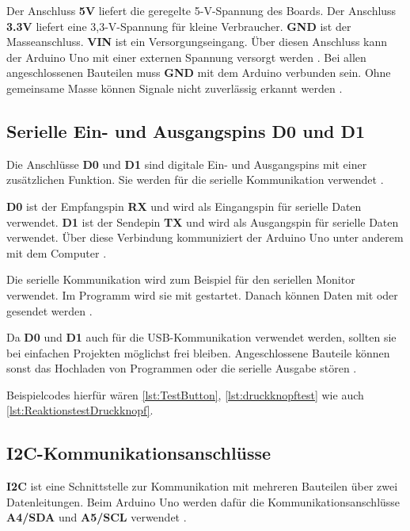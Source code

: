 Der Anschluss \textbf{5V} liefert die geregelte 5-V-Spannung des Boards. Der Anschluss \textbf{3.3V} liefert eine 3,3-V-Spannung für kleine Verbraucher. \textbf{GND} ist der Masseanschluss. \textbf{VIN} ist ein Versorgungseingang. Über diesen Anschluss kann der Arduino Uno mit einer externen Spannung versorgt werden \cite{arduino:uno-datasheet}.
Bei allen angeschlossenen Bauteilen muss \textbf{GND} mit dem Arduino verbunden sein. Ohne gemeinsame Masse können Signale nicht zuverlässig erkannt werden \cite{arduino:uno-components}.


\subsection{Serielle Ein- und Ausgangspins D0 und D1}



Die Anschlüsse \textbf{D0} und \textbf{D1} sind digitale Ein- und Ausgangspins mit einer zusätzlichen Funktion. Sie werden für die serielle Kommunikation verwendet \cite{arduino:uno-datasheet}.

\textbf{D0} ist der Empfangspin \textbf{RX} und wird als Eingangspin für serielle Daten verwendet. \textbf{D1} ist der Sendepin \textbf{TX} und wird als Ausgangspin für serielle Daten verwendet. Über diese Verbindung kommuniziert der Arduino Uno unter anderem mit dem Computer \cite{arduino:uno-datasheet}\cite{arduino:language-reference}.


Die serielle Kommunikation wird zum Beispiel für den seriellen Monitor verwendet. Im Programm wird sie mit  gestartet. Danach können Daten mit  oder  gesendet werden \cite{arduino:language-reference}.

Da \textbf{D0} und \textbf{D1} auch für die USB-Kommunikation verwendet werden, sollten sie bei einfachen Projekten möglichst frei bleiben. Angeschlossene Bauteile können sonst das Hochladen von Programmen oder die serielle Ausgabe stören \cite{arduino:uno-components}.

Beispielcodes hierfür wären \ref{lst:TestButton}, \ref{lst:druckknopftest} wie auch \ref{lst:ReaktionstestDruckknopf}.


\subsection{I2C-Kommunikationsanschlüsse}



\textbf{I2C} ist eine Schnittstelle zur Kommunikation mit mehreren Bauteilen über zwei Datenleitungen. Beim Arduino Uno werden dafür die Kommunikationsanschlüsse \textbf{A4/SDA} und \textbf{A5/SCL} verwendet \cite{arduino:uno-datasheet}.

